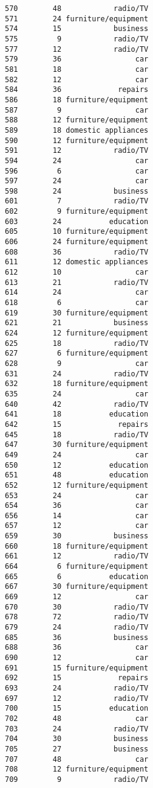 \documentclass[
]{article}
\begin{document}
\begin{verbatim}
570        48            radio/TV
571        24 furniture/equipment
574        15            business
575         9            radio/TV
577        12            radio/TV
579        36                 car
581        18                 car
582        12                 car
584        36             repairs
586        18 furniture/equipment
587         9                 car
588        12 furniture/equipment
589        18 domestic appliances
590        12 furniture/equipment
591        12            radio/TV
594        24                 car
596         6                 car
597        24                 car
598        24            business
601         7            radio/TV
602         9 furniture/equipment
603        24           education
605        10 furniture/equipment
606        24 furniture/equipment
608        36            radio/TV
611        12 domestic appliances
612        10                 car
613        21            radio/TV
614        24                 car
618         6                 car
619        30 furniture/equipment
621        21            business
624        12 furniture/equipment
625        18            radio/TV
627         6 furniture/equipment
628         9                 car
631        24            radio/TV
632        18 furniture/equipment
635        24                 car
640        42            radio/TV
641        18           education
642        15             repairs
645        18            radio/TV
647        30 furniture/equipment
649        24                 car
650        12           education
651        48           education
652        12 furniture/equipment
653        24                 car
654        36                 car
656        14                 car
657        12                 car
659        30            business
660        18 furniture/equipment
661        12            radio/TV
664         6 furniture/equipment
665         6           education
667        30 furniture/equipment
669        12                 car
670        30            radio/TV
678        72            radio/TV
679        24            radio/TV
685        36            business
688        36                 car
690        12                 car
691        15 furniture/equipment
692        15             repairs
693        24            radio/TV
697        12            radio/TV
700        15           education
702        48                 car
703        24            radio/TV
704        30            business
705        27            business
707        48                 car
708        12 furniture/equipment
709         9            radio/TV

\end{verbatim}
\end{document}

